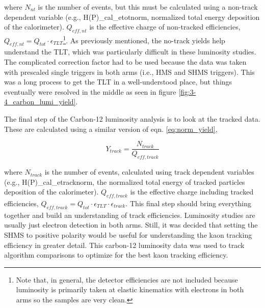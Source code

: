 \documentclass[
]{report}
\begin{document}
\noindent where \(N_{nt}\) is the number of events, but this must be
calculated using a non-track dependent variable (e.g.,
H(P)\_cal\_etotnorm, normalized total energy deposition of the
calorimeter). \(Q_{eff,nt}\) is the effective charge of non-tracked
efficiencies,
\(Q_{eff,nt}=Q_{tot}\cdot\epsilon_{TLT}\)\footnote{Note that, in general, the detector efficiencies are not included because luminosity is primarily taken at elastic kinematics with electrons in both arms so the samples are very clean.}.
As previously mentioned, the no-track yields help understand the TLT,
which was particularly difficult in these luminosity studies. The
complicated correction factor had to be used because the data was taken
with prescaled single triggers in both arms (i.e., HMS and SHMS
triggers). This was a long process to get the TLT in a well-understood
place, but things eventually were resolved in the middle as seen in
figure \ref{fig:3-4_carbon_lumi_yield}.

The final step of the Carbon-12 luminosity analysis is to look at the
tracked data. These are calculated using a similar version of eqn.
\ref{eq:norm_yield},

\begin{equation} 
  Y_{track}=\frac{N_{track}}{Q_{eff,track}}
  \label{eq:track_yield} 
\end{equation}

\noindent where \(N_{track}\) is the number of events, calculated using
track dependent variables (e.g., H(P)\_cal\_etracknorm, the normalized
total energy of tracked particles deposition of the calorimeter).
\(Q_{eff,track}\) is the effective charge including tracked
efficiencies,
\(Q_{eff,track}=Q_{tot}\cdot\epsilon_{TLT}\cdot\epsilon_{track}\). This
final step should bring everything together and build an understanding
of track efficiencies. Luminosity studies are usually just electron
detection in both arms. Still, it was decided that setting the SHMS to
positive polarity would be useful for understanding the kaon tracking
efficiency in greater detail. This carbon-12 luminosity data was used to
track algorithm comparisons to optimize for the best kaon tracking
efficiency.
\end{document}
